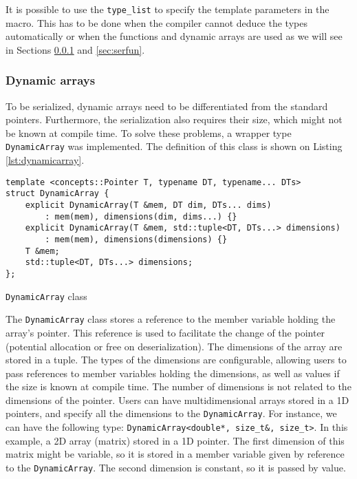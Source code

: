 It is possible to use the \texttt{type\_list} to specify the template parameters
in the macro. This has to be done when the compiler cannot deduce the types
automatically or when the functions and dynamic arrays are used as we will see
in Sections \ref{sec:dynarr} and \ref{sec:serfun}.

\subsubsection{Dynamic arrays}
\label{sec:dynarr}

To be serialized, dynamic arrays need to be differentiated from the standard
pointers. Furthermore, the serialization also requires their size, which might
not be known at compile time. To solve these problems, a wrapper type
\texttt{DynamicArray} was implemented. The definition of this class is shown on
Listing \ref{lst:dynamicarray}.

\begin{listing}[ht!]
\begin{verbatim}
template <concepts::Pointer T, typename DT, typename... DTs>
struct DynamicArray {
    explicit DynamicArray(T &mem, DT dim, DTs... dims)
        : mem(mem), dimensions(dim, dims...) {}
    explicit DynamicArray(T &mem, std::tuple<DT, DTs...> dimensions)
        : mem(mem), dimensions(dimensions) {}
    T &mem;
    std::tuple<DT, DTs...> dimensions;
};
\end{verbatim}
\caption{\texttt{DynamicArray} class}
\label{lst:dynamicarray}
\end{listing}

The \texttt{DynamicArray} class stores a reference to the member variable
holding the array's pointer. This reference is used to facilitate the change of
the pointer (potential allocation or free on deserialization). The dimensions of
the array are stored in a tuple. The types of the dimensions are configurable,
allowing users to pass references to member variables holding the dimensions, as
well as values if the size is known at compile time. The number of dimensions is
not related to the dimensions of the pointer. Users can have multidimensional
arrays stored in a 1D pointers, and specify all the dimensions to the
\texttt{DynamicArray}. For instance, we can have the following type:
\texttt{DynamicArray<double*, size\_t\&, size\_t>}. In this example, a 2D array
(matrix) stored in a 1D pointer. The first dimension of this matrix might be
variable, so it is stored in a member variable given by reference to the
\texttt{DynamicArray}. The second dimension is constant, so it is passed by
value.

